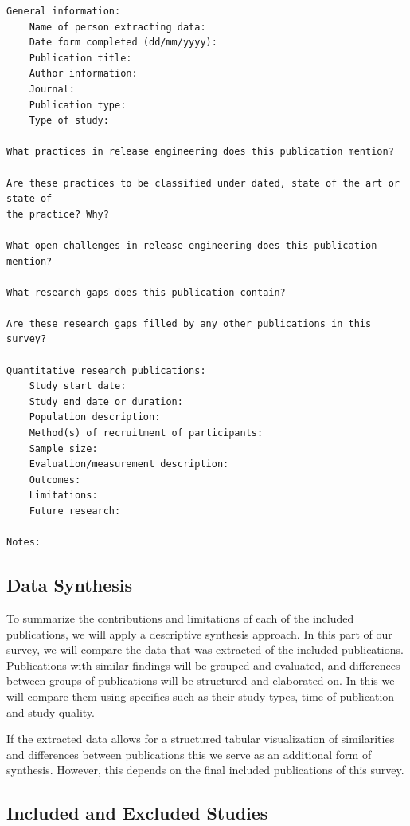 \documentclass[]{book}
\begin{document}
\begin{verbatim}
General information:
    Name of person extracting data:
    Date form completed (dd/mm/yyyy):
    Publication title:
    Author information:
    Journal:
    Publication type:
    Type of study:

What practices in release engineering does this publication mention?

Are these practices to be classified under dated, state of the art or state of
the practice? Why?

What open challenges in release engineering does this publication mention?

What research gaps does this publication contain?

Are these research gaps filled by any other publications in this survey?

Quantitative research publications:
    Study start date:
    Study end date or duration:
    Population description:
    Method(s) of recruitment of participants:
    Sample size:
    Evaluation/measurement description:
    Outcomes:
    Limitations:
    Future research:

Notes:
\end{verbatim}

\subsection{Data Synthesis}\label{data-synthesis}

To summarize the contributions and limitations of each of the included
publications, we will apply a descriptive synthesis approach. In this
part of our survey, we will compare the data that was extracted of the
included publications. Publications with similar findings will be
grouped and evaluated, and differences between groups of publications
will be structured and elaborated on. In this we will compare them using
specifics such as their study types, time of publication and study
quality.

If the extracted data allows for a structured tabular visualization of
similarities and differences between publications this we serve as an
additional form of synthesis. However, this depends on the final
included publications of this survey.

\subsection{Included and Excluded
Studies}\label{included-and-excluded-studies}
\end{document}
